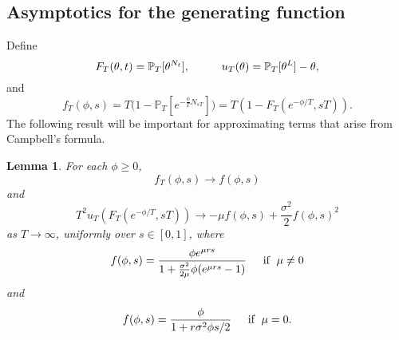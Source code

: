 \documentclass{article}
\theoremstyle{plain}
\newtheorem{lem}[thm]{Lemma}
\theoremstyle{definition}
\renewcommand{\P}{\mathbb{P}}
\begin{document}
\subsection{Asymptotics for the generating function}

Define
\[F_T(\theta,t) = \P_T[\theta^{N_t}], \hspace{10mm} u_T(\theta) = \P_T[\theta^L] - \theta,\]
and
\[f_T(\phi,s) = T \big( 1 - \P_T[e^{- \frac{ \phi}{T} N_{sT} } ] \big) = T(1-F_T(e^{-\phi/T},sT)).\]
The following result will be important for approximating terms that arise from Campbell's formula.

\begin{lem}\label{fTconv}
For each $\phi\ge 0$,
\[f_T(\phi,s)\to f(\phi,s)\]
and
\[T^2 u_T(F_T(e^{-\phi/T},sT)) \to -\mu f(\phi,s) + \frac{\sigma^2}{2}f(\phi,s)^2\]
as $T\to\infty$, uniformly over $s\in[0,1]$, where
\[f(\phi,s) = \frac{ \phi e^{ \mu r s }}{ 1 + \frac{\sigma^2}{2\mu}  \phi ( e^{ \mu r s } - 1 )} \hspace{4mm} \hbox{ if } \hspace{1mm} \mu\neq 0 \]
and
\[f(\phi,s) = \frac{\phi}{1+r\sigma^2\phi s/2} \hspace{4mm} \hbox{ if } \hspace{1mm} \mu= 0.\]
\end{lem}
\end{document}
